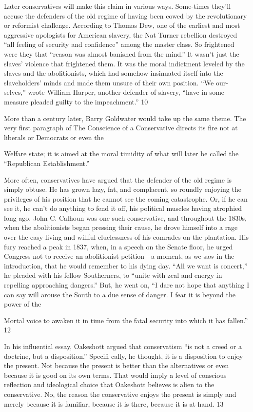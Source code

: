  \par 
Later conservatives will make this claim in various ways. Some-times they’ll accuse the defenders of the old regime of having been cowed by the revolutionary or reformist challenge. According to Thomas Dew, one of the earliest and most aggressive apologists for American slavery, the Nat Turner rebellion destroyed “all feeling of security and confidence” among the master class. So frightened were they that “reason was almost banished from the mind.” It wasn’t just the slaves’ violence that frightened them. It was the moral indictment leveled by the slaves and the abolitionists, which had somehow insinuated itself into the slaveholders’ minds and made them unsure of their own position. “We our-selves,” wrote William Harper, another defender of slavery, “have in some measure pleaded guilty to the impeachment.” 10
 \par 
More than a century later, Barry Goldwater would take up the same theme. The very first paragraph of The Conscience of a Conservative directs its fire not at liberals or Democrats or even the
 \par 
Welfare state; it is aimed at the moral timidity of what will later be called the “Republican Establishment.”
 \par 
More often, conservatives have argued that the defender of the old regime is simply obtuse. He has grown lazy, fat, and complacent, so roundly enjoying the privileges of his position that he cannot see the coming catastrophe. Or, if he can see it, he can’t do anything to fend it off, his political muscles having atrophied long ago. John C. Calhoun was one such conservative, and throughout the 1830s, when the abolitionists began pressing their cause, he drove himself into a rage over the easy living and willful cluelessness of his comrades on the plantation. His fury reached a peak in 1837, when, in a speech on the Senate floor, he urged Congress not to receive an abolitionist petition—a moment, as we saw in the introduction, that he would remember to his dying day. “All we want is concert,” he pleaded with his fellow Southerners, to “unite with zeal and energy in repelling approaching dangers.” But, he went on, “I dare not hope that anything I can say will arouse the South to a due sense of danger. I fear it is beyond the power of the
 \par 
Mortal voice to awaken it in time from the fatal security into which it has fallen.” 12
 \par 
In his influential essay, Oakeshott argued that conservatism “is not a creed or a doctrine, but a disposition.” Specifi cally, he thought, it is a disposition to enjoy the present. Not because the present is better than the alternatives or even because it is good on its own terms. That would imply a level of conscious reflection and ideological choice that Oakeshott believes is alien to the conservative. No, the reason the conservative enjoys the present is simply and merely because it is familiar, because it is there, because it is at hand. 13
